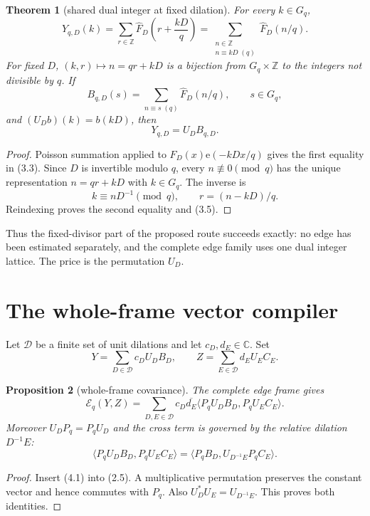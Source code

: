 \documentclass[11pt]{article}
\newtheorem{theorem}{Theorem}[section]
\newtheorem{proposition}[theorem]{Proposition}
\newcommand{\C}{\mathbb C}
\newcommand{\e}{\mathrm e}
\newcommand{\Gq}{G_q}
\newcommand{\cE}{\mathcal E}
\begin{document}
\begin{theorem}[shared dual integer at fixed dilation]
\label{thm:poisson}
For every $k\in\Gq$,
\[
 \boxed{
 Y_{q,D}(k)=\sum_{r\in\mathbb Z}\widehat F_D\!\left(r+\frac{kD}{q}\right)
 =\sum_{\substack{n\in\mathbb Z\\n\equiv kD\;(q)}}\widehat F_D(n/q).}
 \tag{3.3}
\]
For fixed $D$, $(k,r)\mapsto n=qr+kD$ is a bijection from
$\Gq\times\mathbb Z$ to the integers not divisible by $q$.  If
\[
 B_{q,D}(s)=\sum_{n\equiv s\;(q)}\widehat F_D(n/q),
 \qquad s\in\Gq,
 \tag{3.4}
\]
and $(U_Db)(k)=b(kD)$, then
\[
 \boxed{Y_{q,D}=U_DB_{q,D}.}
 \tag{3.5}
\]
\end{theorem}

\begin{proof}
Poisson summation applied to $F_D(x)\e(-kDx/q)$ gives the first equality
in (3.3).  Since $D$ is invertible modulo $q$, every
$n\not\equiv0\pmod q$ has the unique representation $n=qr+kD$ with
$k\in\Gq$.  The inverse is
\[
 k\equiv nD^{-1}\pmod q,
 \qquad r=(n-kD)/q.
\]
Reindexing proves the second equality and (3.5).
\end{proof}

Thus the fixed-divisor part of the proposed route succeeds exactly: no edge
has been estimated separately, and the complete edge family uses one dual
integer lattice.  The price is the permutation $U_D$.

\section{The whole-frame vector compiler}

Let $\mathcal D$ be a finite set of unit dilations and let $c_D,d_E\in\C$.
Set
\[
 Y=\sum_{D\in\mathcal D}c_DU_DB_D,
 \qquad
 Z=\sum_{E\in\mathcal D}d_EU_EC_E.
 \tag{4.1}
\]

\begin{proposition}[whole-frame covariance]
\label{prop:covariance}
The complete edge frame gives
\[
 \boxed{
 \cE_q(Y,Z)=\sum_{D,E\in\mathcal D}c_D\overline{d_E}
 \langle P_qU_DB_D,P_qU_EC_E\rangle.}
 \tag{4.2}
\]
Moreover $U_DP_q=P_qU_D$ and the cross term is governed by the relative
dilation $D^{-1}E$:
\[
 \langle P_qU_DB_D,P_qU_EC_E\rangle
 =\langle P_qB_D,U_{D^{-1}E}P_qC_E\rangle.
 \tag{4.3}
\]
\end{proposition}

\begin{proof}
Insert (4.1) into (2.5).  A multiplicative permutation preserves the
constant vector and hence commutes with $P_q$.  Also
$U_D^*U_E=U_{D^{-1}E}$.  This proves both identities.
\end{proof}
\end{document}
